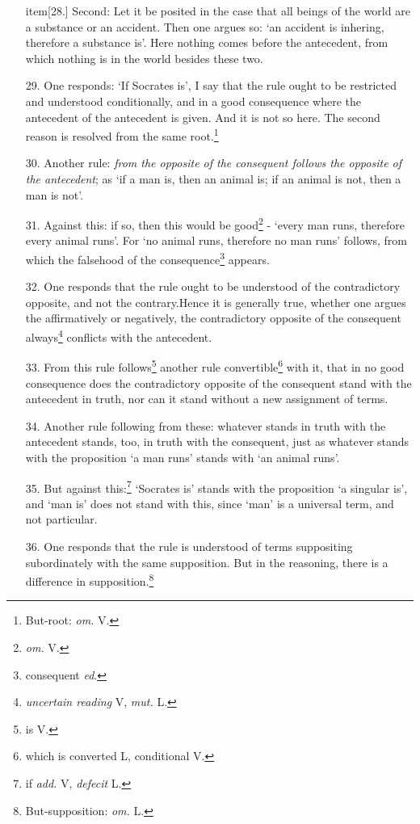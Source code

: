 \documentclass[]{article}
\begin{document}
\begin{enumerate}
	item[28.] Second: Let it be posited in the case that all beings of the world are a substance or an accident. Then one argues so: `an accident is inhering, therefore a substance is'. Here nothing comes before the antecedent, from which nothing is in the world besides these two. 
	\item[29.] One responds: `If Socrates is', I say that the rule ought to be restricted and understood conditionally, and in a good consequence where the antecedent of the antecedent is given. And it is not so here. 
	The second reason is resolved from the same root.\footnote{But-root: \textit{om.} V.}
	\item[30.] Another rule: \textit{from the opposite of the consequent follows the opposite of the antecedent}; as `if a man is, then an animal is; if an animal is not, then a man is not'. 
	\item[31.] Against this: if so, then this would be good\footnote{\textit{om.} V.} - `every man runs, therefore every animal runs'. For `no animal runs, therefore no man runs' follows, from which the falsehood of the consequence\footnote{consequent \textit{ed}.} appears. 
	\item[32.] One responds that the rule ought to be understood of the contradictory opposite, and not the contrary.Hence it is generally true, whether one argues the affirmatively or negatively, the contradictory opposite of the consequent always\footnote{\textit{uncertain reading} V, \textit{mut.} L.} conflicts with the antecedent.
	\item[33.] From this rule follows\footnote{is V.} another rule convertible\footnote{which is converted L, conditional V.} with it, that in no good consequence does the contradictory opposite of the consequent stand with the antecedent in truth, nor can it stand without a new assignment of terms. 
	\item[34.] Another rule following from these: whatever stands in truth with the antecedent stands, too, in truth with the consequent, just as whatever stands with the proposition `a man runs' stands with `an animal runs'. 
	\item[35.] But against this:\footnote{if \textit{add.} V, \textit{defecit} L.} `Socrates is' stands with the proposition `a singular is', and `man is' does not stand with this, since `man' is a universal term, and not particular.
	\item[36.] One responds that the rule is understood of terms suppositing subordinately with the same supposition. But in the reasoning, there is a difference in supposition.\footnote{But-supposition: \textit{om.} L.}

\end{enumerate}
\end{document}
